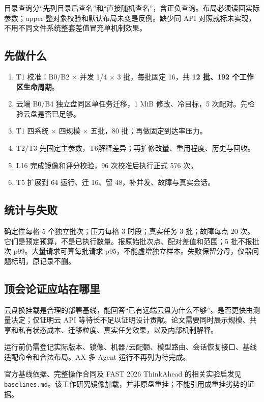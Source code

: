 \documentclass[UTF8,11pt,a4paper,fontset=windows]{ctexart}
\begin{document}
目录查询分“先列目录后查名”和“直接随机查名”，含正负查询。布局必须读回实际参数；upper 整对象校验和默认布局未变是反例。缺少同 API 对照就标未实现，不用不同文件系统整套差值冒充单机制效果。

\subsection*{先做什么}
\begin{enumerate}
\item T1 校准：B0/B2 $\times$ 并发 1/4 $\times$ 3 批，每批固定 16，共 \textbf{12 批、192 个工作区生命周期}。
\item 云端 B0/B4 独立盘同区单任务迁移，1 MiB 修改、冷目标，5 次配对。先检验云盘是否已足够。
\item T1 四系统 $\times$ 四规模 $\times$ 五批，80 批；再做固定到达率压力。
\item T2/T3 先固定主参数，T6解释差异；再扩修改量、重用程度、历史与回收。
\item L16 完成镜像和评分校验，96 次校准后执行正式 576 次。
\item T5 扩展到 64 运行、迁 16、留 48，补并发、故障与真实会话。
\end{enumerate}

\subsection*{统计与失败}
确定性每格 5 个独立批次；压力每格 3 时段；真实任务 3 批；故障每点 20 次。它们是预定预算，不是已执行数量。报原始批次点、配对差值和范围；5 批不报批次 p99。大量请求可算每批请求 p95，不能虚增独立样本。失败保留分母，仪器问题标明，原记录不删。

\subsection*{顶会论证应站在哪里}
云盘换挂载是合理的部署基线，能回答“已有远端云盘为什么不够”。是否更快由测量决定；仅证明云 API 等待长不足以证明设计贡献。论文需要同时展示规模、共享和私有状态成本、迁移粒度、真实任务效果，以及内部机制解释。

运行前仍需登记实际版本、镜像、机器/云配额、模型路由、会话恢复接口、基线适配命令和合法布局。AX 多 Agent 运行不再列为待完成。

{\small 官方基线依据、完整操作合同及 FAST 2026 ThinkAhead 的相关实验启发见 \texttt{baselines.md}。该工作研究镜像加载，并非原盘重挂；不能引用成重挂劣势的证据。}
\end{document}
